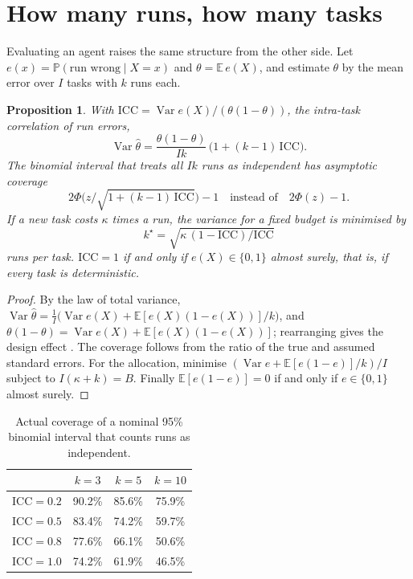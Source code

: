 \documentclass[11pt]{article}
\newtheorem{proposition}{Proposition}
\theoremstyle{definition}
\newcommand{\E}{\mathbb{E}}
\renewcommand{\P}{\mathbb{P}}
\begin{document}
\section{How many runs, how many tasks}

Evaluating an agent raises the same structure from the other side. Let $e(x)=\P(\text{run
wrong}\mid X=x)$ and $\theta=\E\,e(X)$, and estimate $\theta$ by the mean error over $I$ tasks with $k$
runs each.

\begin{proposition}\label{prop:eval}
With $\mathrm{ICC}=\operatorname{Var}e(X)/(\theta(1-\theta))$, the intra-task correlation of
run errors,
\[
\operatorname{Var}\hat\theta=\frac{\theta(1-\theta)}{Ik}\,\big(1+(k-1)\,\mathrm{ICC}\big).
\]
The binomial interval that treats all $Ik$ runs as independent has asymptotic coverage
\[
2\Phi\Big(z\big/\sqrt{1+(k-1)\,\mathrm{ICC}}\Big)-1\quad\text{instead of}\quad 2\Phi(z)-1.
\]
If a new task costs $\kappa$ times a run, the variance for a fixed budget is minimised by
\[
k^\star=\sqrt{\kappa\,(1-\mathrm{ICC})/\mathrm{ICC}}
\]
runs per task. $\mathrm{ICC}=1$ if and only if $e(X)\in\{0,1\}$ almost surely, that is, if every
task is deterministic.
\end{proposition}

\begin{proof}
By the law of total variance, $\operatorname{Var}\hat\theta=\frac1I\big(\operatorname{Var}e(X)+
\E[e(X)(1-e(X))]/k\big)$, and $\theta(1-\theta)=\operatorname{Var}e(X)+\E[e(X)(1-e(X))]$; rearranging
gives the design effect \citep{kish1965survey}. The coverage follows from the ratio of the true and
assumed standard errors. For the allocation, minimise
$(\operatorname{Var}e+\E[e(1-e)]/k)/I$ subject to $I(\kappa+k)=B$. Finally $\E[e(1-e)]=0$ if and only
if $e\in\{0,1\}$ almost surely.
\end{proof}

\begin{table}[t]
\centering
\small
\begin{tabular}{lccc}
\toprule
& $k=3$ & $k=5$ & $k=10$\\
\midrule
$\mathrm{ICC}=0.2$ & 90.2\% & 85.6\% & 75.9\%\\
$\mathrm{ICC}=0.5$ & 83.4\% & 74.2\% & 59.7\%\\
$\mathrm{ICC}=0.8$ & 77.6\% & 66.1\% & 50.6\%\\
$\mathrm{ICC}=1.0$ & 74.2\% & 61.9\% & 46.5\%\\
\bottomrule
\end{tabular}
\caption{Actual coverage of a nominal 95\% binomial interval that counts runs as independent.}
\label{tab:naive}
\end{table}
\end{document}
